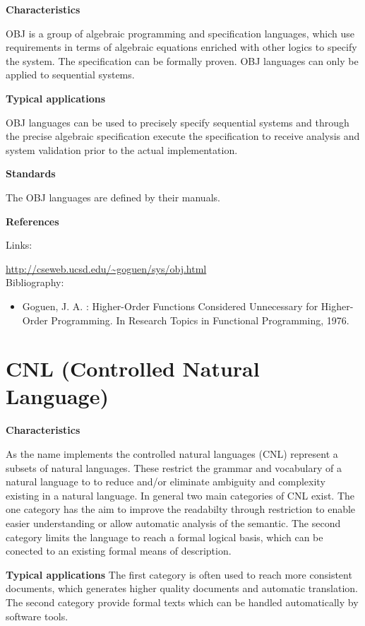 \documentclass{./template/openetcs_report}
\begin{document}
	\textbf{Characteristics}

 OBJ is a group of algebraic programming and specification languages, which use requirements in terms of algebraic equations enriched with other logics to specify the system. The specification can be formally proven. OBJ languages can only be applied to sequential systems.
 
 	\textbf{Typical applications}

OBJ languages can be used to precisely specify sequential systems and through the precise algebraic specification execute the specification to receive analysis and system validation prior to the actual implementation.

	\textbf{Standards}

The OBJ languages are defined by their manuals.

	\textbf{References}

Links:

\url{http://cseweb.ucsd.edu/~goguen/sys/obj.html} \\[4pt]

Bibliography:

\begin{itemize}
\item Goguen,  J. A. : Higher-Order Functions Considered Unnecessary for Higher-Order Programming. In Research Topics in Functional Programming, 1976.
\end{itemize}


\section{CNL (Controlled Natural Language)}


	\textbf{Characteristics}

As the name implements the controlled natural languages (CNL) represent a  subsets of natural languages. These restrict the grammar and vocabulary of a natural language to to reduce and/or eliminate ambiguity and complexity existing in a natural language. In general two main categories of CNL exist. The one category has the aim to improve the readabilty through restriction to enable easier understanding or allow automatic analysis of the semantic. The second category limits the language to reach a formal logical basis, which can be conected to an existing formal means of description.

	\textbf{Typical applications}
The first category is often used to reach more consistent documents, which generates higher quality documents and automatic translation. The second category provide formal texts which can be handled automatically by software tools.
\end{document}
